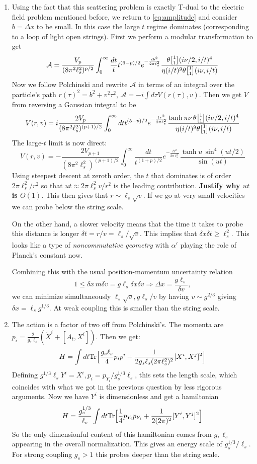 \documentclass[11pt, class=article, crop=false]{standalone}
\begin{document}
\begin{enumerate}
	\item Using the fact that this scattering problem is exactly T-dual to the electric field problem mentioned before, we return to \eqref{eq:amplitude} and consider $b= \Delta x$ to be small. In this case the large $t$ regime dominates (corresponding to a loop of light open strings). First we perform a modular transformation to get
	\[
		\mathcal A = \frac{V_p}{(8\pi^2 \ell_s^2)^{p/2}} \int_0^\infty \frac{dt}{t} t^{(6-p)/2} e^{-\frac{t b^2}{2 \pi \ell_s^2}} \frac{\theta \twist11(i \nu/2, i/t)^4}{\eta(i/t)^9 \theta \twist11 (i \nu, i/t)}
	\]
	Now we follow Polchinski and rewrite $\mathcal A$ in terms of an integral over the particle's path $r(\tau)^2 = b^2 + v^2 \tau^2$, $\mathcal A = -i \int d\tau V(r(\tau), v)$. Then we get $V$ from reversing a Gaussian integral to be
	\[
		V(r, v) = i \frac{2V_p}{(8 \pi^2 \ell_s^2)^{(p+1)/2}} \int_0^\infty dt t^{(5-p)/2} e^{-\frac{t r^2}{2 \pi \ell_s^2}} \frac{\tanh \pi \nu \, \theta \twist11(i \nu/2, i/t)^4}{\eta(i/t)^9 \theta \twist11 (i \nu, i/t)}
	\]
	The large-$t$ limit is now direct:
	\[
		V(r, v) = - \frac{2V_{p+1}}{(8 \pi^2 \ell_s^2)^{(p+1)/2}} \int_0^\infty \frac{dt}{t^{(1+p)/2}} e^{-\frac{t r^2}{2 \pi \ell_s^2}} \frac{\tanh u \, \sin^4(u t/2)}{\sin(u t)}
	\]
	Using steepest descent at zeroth order, the $t$ that dominates is of order $2 \pi \ell_s^2/r^2$ so that $u t \approx 2 \pi \ell_s^2 v/r^2$ is the leading contribution. \textbf{Justify why $u t$ is $O(1)$}. This then gives that $r \sim \ell_s \sqrt{v}$. If we go at very small velocities we can probe below the string scale. 
	
	On the other hand, a slower velocity means that the time it takes to probe this distance is longer $\delta t = r/v = \ell_s/\sqrt{v}$. This implies that $\delta x \delta t \geq \ell_s^2$. This looks like a type of \emph{noncommutative geometry} with $\alpha'$ playing the role of Planck's constant now.
	
	Combining this with the usual position-momentum uncertainty relation 
	\[
		1 \leq \delta x \, m \delta v = g \ell_s \delta x \delta v \Rightarrow \Delta x = \frac{g \ell_s}{\delta v},
	\]
	 we can minimize simultaneously $\ell_s \sqrt v, g \ell_s/v$ by having $v \sim g^{2/3}$ giving $\delta x = \ell_s g^{1/3}$. At weak coupling this is smaller than the string scale. 
	
	\item The action is a factor of two off from Polchinski's. The momenta are $p_i = \frac{2}{g_s \ell_s} (\dot X^i + [A_t, X^i])$. Then we get:
	\[
		H = \int dt \mathrm{Tr}\Big[\frac{g_s \ell_s}{4} p_i p^i + \frac{1}{2 g_s \ell_s (2\pi \ell_s^2)^2} [X^i, X^j]^2\Big]
	\]
	Defining $g^{1/3} \ell_s Y^i = X^i, p_i = p_{Y_i}/g_s^{1/3} \ell_s$, this sets the length scale, which coincides with what we got in the previous question by less rigorous arguments. Now we have $Y^i$ is dimensionless and get a hamiltonian
	\[
		H = \frac{g_s^{1/3}}{\ell_s} \int dt \mathrm{Tr}\Big[\frac14 p_{Y_i} p_{Y_i} + \frac{1}{2 (2\pi )^2} [Y^i, Y^j]^2\Big]
	\]
	So the only dimensionful content of this hamiltonian comes from $g, \ell_s$ appearing in the overall normalization. This gives an energy scale of $g_s^{1/3}/\ell_s$. For strong coupling $g_s > 1$ this probes deeper than the string scale. 
	

\end{enumerate}
\end{document}
